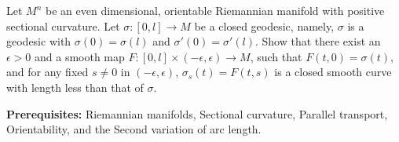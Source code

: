 \begin{exercise}
\label{geometry:2013:5}
Let $M^{n}$ be an even dimensional, orientable Riemannian manifold with positive sectional curvature. Let $\sigma : [0, l] \to M$ be a closed geodesic, namely, $\sigma$ is a geodesic with $\sigma(0) = \sigma(l)$ and $\sigma'(0) = \sigma'(l)$. Show that there exist an $\epsilon > 0$ and a smooth map $F : [0, l] \times (-\epsilon, \epsilon) \to M$, such that $F(t, 0) = \sigma(t)$, and for any fixed $s \neq 0$ in $(-\epsilon, \epsilon)$, $\sigma_{s}(t) = F(t, s)$ is a closed smooth curve with length less than that of $\sigma$.
\end{exercise}

\begin{solution}
\textbf{Prerequisites:} Riemannian manifolds, Sectional curvature, Parallel transport, Orientability, and the Second variation of arc length.


\end{solution}
